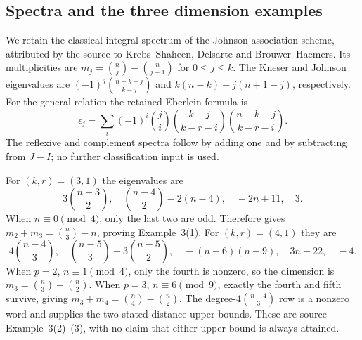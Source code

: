 \subsection{Spectra and the three dimension examples}
We retain the classical integral spectrum of the Johnson association
scheme, attributed by the source to Krebs--Shaheen, Delsarte and
Brouwer--Haemers. Its multiplicities are
$m_j=\binom nj-\binom n{j-1}$ for $0\leq j\leq k$.
The Kneser and Johnson eigenvalues are
$(-1)^j\binom{n-k-j}{k-j}$ and $k(n-k)-j(n+1-j)$, respectively.
For the general relation the retained Eberlein formula is
\[
 \epsilon_j=\sum_i(-1)^i\binom ji\binom{k-j}{k-r-i}
                                 \binom{n-k-j}{k-r-i}.
\]
The reflexive and complement spectra follow by adding one and by
subtracting from $J-I$; no further classification input is used.

For $(k,r)=(3,1)$ the eigenvalues are
\[
 3\binom{n-3}{2},\quad \binom{n-4}{2}-2(n-4),\quad-2n+11,\quad3.
\]
When $n\equiv0\pmod4$, only the last two are odd. Therefore
 gives $m_2+m_3=\binom n3-n$, proving Example~3(1).
For $(k,r)=(4,1)$ they are
\[
 4\binom{n-4}{3},\quad \binom{n-5}{3}-3\binom{n-5}{2},\quad
 -(n-6)(n-9),\quad3n-22,\quad-4.
\]
When $p=2$, $n\equiv1\pmod4$, only the fourth is nonzero, so the
dimension is $m_3=\binom n3-\binom n2$.
When $p=3$, $n\equiv6\pmod9$, exactly the fourth and fifth survive,
giving $m_3+m_4=\binom n4-\binom n2$.
The degree-$4\binom{n-4}{3}$ row is a nonzero word and supplies the two
stated distance upper bounds. These are source Example~3(2)--(3), with
no claim that either upper bound is always attained.
